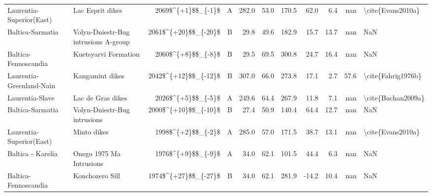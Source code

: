 \begin{longtable}{p{1 in}p{1 in}rrrrrrrr}
      Laurentia-Superior(East) &                                   Lac Esprit dikes &     2069\$\textasciicircum \{+1\}\$\$\_\{-1\}\$ &      A &     282.0 &      53.0 & 170.5 &  62.0 &       6.4 &         nan &                                  \textbackslash cite\{Evans2010a\} \\
              Baltica-Sarmatia &               Volyn-Dniestr-Bug intrusions A-group &   2061\$\textasciicircum \{+20\}\$\$\_\{-20\}\$ &      B &      29.8 &      49.6 & 182.9 &  15.7 &      13.7 &         nan &                                                NaN \\
          Baltica-Fennoscandia &                               Kuetsyarvi Formation &     2060\$\textasciicircum \{+8\}\$\$\_\{-8\}\$ &      B &      29.5 &      69.5 & 300.8 &  24.7 &      16.4 &         nan &                                                NaN \\
      Laurentia-Greenland-Nain &                                    Kangamiut dikes &   2042\$\textasciicircum \{+12\}\$\$\_\{-12\}\$ &      B &     307.0 &      66.0 & 273.8 &  17.1 &       2.7 &        57.6 &                                 \textbackslash cite\{Fahrig1976b\} \\
               Laurentia-Slave &                                  Lac de Gras dikes &     2026\$\textasciicircum \{+5\}\$\$\_\{-5\}\$ &      A &     249.6 &      64.4 & 267.9 &  11.8 &       7.1 &         nan &                                 \textbackslash cite\{Buchan2009a\} \\
              Baltica-Sarmatia &                       Volyn-Dniestr-Bug intrusions &   2000\$\textasciicircum \{+10\}\$\$\_\{-10\}\$ &      B &      27.4 &      50.9 & 140.4 &  64.4 &      12.7 &         nan &                                                NaN \\
      Laurentia-Superior(East) &                                        Minto dikes &     1998\$\textasciicircum \{+2\}\$\$\_\{-2\}\$ &      A &     285.0 &      57.0 & 171.5 &  38.7 &      13.1 &         nan &                                  \textbackslash cite\{Evans2010a\} \\
             Baltica - Karelia &                           Onego 1975 Ma Intrusions &     1976\$\textasciicircum \{+9\}\$\$\_\{-9\}\$ &      A &      34.0 &      62.1 & 101.5 &  44.4 &       6.3 &         nan &                                                NaN \\
          Baltica-Fennoscandia &                                    Konchozero Sill &   1974\$\textasciicircum \{+27\}\$\$\_\{-27\}\$ &      B &      34.0 &      62.1 & 281.9 & -14.2 &      10.4 &         nan &                                                NaN \\

\end{longtable}
